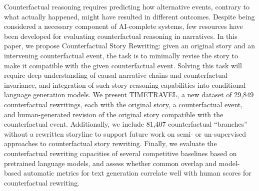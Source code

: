 Counterfactual reasoning requires predicting how alternative events, contrary to what actually happened, might have resulted in different outcomes. Despite being considered a necessary component of AI-complete systems, few resources have been developed for evaluating counterfactual reasoning in narratives. In this paper, we propose Counterfactual Story Rewriting: given an original story and an intervening counterfactual event, the task is to minimally revise the story to make it compatible with the given counterfactual event. Solving this task will require deep understanding of causal narrative chains and counterfactual invariance, and integration of such story reasoning capabilities into conditional language generation models. We present TIMETRAVEL, a new dataset of 29,849 counterfactual rewritings, each with the original story, a counterfactual event, and human-generated revision of the original story compatible with the counterfactual event. Additionally, we include 81,407 counterfactual ``branches'' without a rewritten storyline to support future work on semi- or un-supervised approaches to counterfactual story rewriting. Finally, we evaluate the counterfactual rewriting capacities of several competitive baselines based on pretrained language models, and assess whether common overlap and model-based automatic metrics for text generation correlate well with human scores for counterfactual rewriting.
